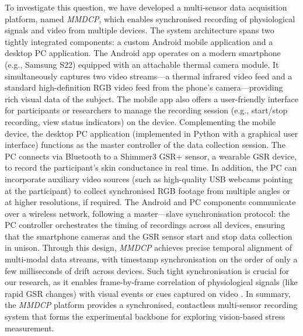 \documentclass[11pt,a4paper]{report}
\begin{document}
To investigate this question, we have developed a multi-sensor data acquisition platform, named \textit{MMDCP}, which enables synchronised recording of physiological signals and video from multiple devices. The system architecture spans two tightly integrated components: a custom Android mobile application and a desktop PC application. The Android app operates on a modern smartphone (e.g., Samsung S22) equipped with an attachable thermal camera module. It simultaneously captures two video streams—a thermal infrared video feed and a standard high-definition RGB video feed from the phone's camera—providing rich visual data of the subject. The mobile app also offers a user-friendly interface for participants or researchers to manage the recording session (e.g., start/stop recording, view status indicators) on the device. Complementing the mobile device, the desktop PC application (implemented in Python with a graphical user interface) functions as the master controller of the data collection session. The PC connects via Bluetooth to a Shimmer3 GSR+ sensor, a wearable GSR device, to record the participant's skin conductance in real time. In addition, the PC can incorporate auxiliary video sources (such as high-quality USB webcams pointing at the participant) to collect synchronised RGB footage from multiple angles or at higher resolutions, if required. The Android and PC components communicate over a wireless network, following a master--–slave synchronisation protocol: the PC controller orchestrates the timing of recordings across all devices, ensuring that the smartphone cameras and the GSR sensor start and stop data collection in unison. Through this design, \textit{MMDCP} achieves precise temporal alignment of multi-modal data streams, with timestamp synchronisation on the order of only a few milliseconds of drift across devices. Such tight synchronisation is crucial for our research, as it enables frame-by-frame correlation of physiological signals (like rapid GSR changes) with visual events or cues captured on video \cite{Gravina2017}. In summary, the \textit{MMDCP} platform provides a synchronised, contactless multi-sensor recording system that forms the experimental backbone for exploring vision-based stress measurement.
\end{document}
